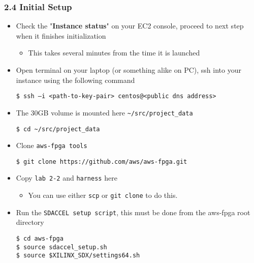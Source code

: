 \documentclass[]{article}
\begin{document}
\hypertarget{header-n266}{%
\subsubsection{2.4 Initial Setup}\label{header-n266}}

\begin{itemize}
\item
  Check the "\textbf{Instance status}" on your EC2 console, proceed to
  next step when it finishes initialization

  \begin{itemize}
  \item
    This takes several minutes from the time it is launched 
  \end{itemize}
\item
  Open terminal on your laptop (or something alike on PC), ssh into your
  instance using the following command

\begin{verbatim}
$ ssh –i <path-to-key-pair> centos@<public dns address>
\end{verbatim}
\end{itemize}

\begin{itemize}
\item
  The 30GB volume is mounted here
  \texttt{\textasciitilde{}/src/project\_data}

\begin{verbatim}
$ cd ~/src/project_data
\end{verbatim}
\end{itemize}

\begin{itemize}
\item
  Clone \texttt{aws-fpga\ tools}

\begin{verbatim}
$ git clone https://github.com/aws/aws-fpga.git
\end{verbatim}
\end{itemize}

\begin{itemize}
\item
  Copy \texttt{lab\ 2-2} and \texttt{harness} here

  \begin{itemize}
  \item
    You can use either \texttt{scp} or \texttt{git\ clone} to do this.
  \end{itemize}
\item
  Run the \texttt{SDACCEL\ setup\ script}, this must be done from the
  aws-fpga root directory

\begin{verbatim}
$ cd aws-fpga
$ source sdaccel_setup.sh
$ source $XILINX_SDX/settings64.sh
\end{verbatim}
\end{itemize}
\end{document}
